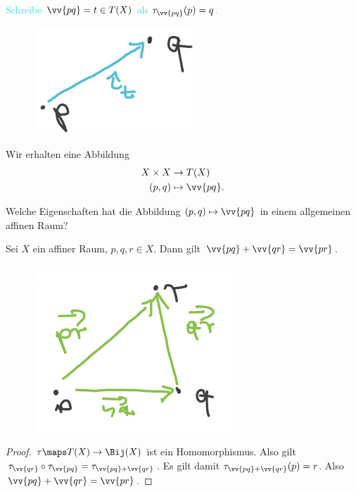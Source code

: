 \textcolor{Turquoise}{Schreibe \( \vv{pq}=t\in T(X) \) als \( \tau_{\vv{pq}}(p)=q \).}
\begin{figure}[H]
    \centering
    \includegraphics[width=0.2\linewidth]{figures/vektornotation}
    \label{fig:vektornotation}
\end{figure}
Wir erhalten eine Abbildung
\begin{align*}
    X\times X&\to T(X)\\
    (p,q)&\mapsto \vv{pq}.
\end{align*}
\begin{frage*}
    Welche Eigenschaften hat die Abbildung \( (p,q)\mapsto \vv{pq} \) in einem allgemeinen affinen Raum?
\end{frage*}
\begin{lemma}\label{vektoren_funzen_richtig}
    Sei \( X \) ein affiner Raum, \( p,q,r\in X \). Dann gilt \( \vv{pq}+\vv{qr}=\vv{pr} \).
\end{lemma}
\begin{figure}[H]
    \centering
    \includegraphics[width=0.3\linewidth]{figures/vektoren_funzen_richtig}
    \label{fig:vektoren_funzen_richtig}
\end{figure}
\begin{proof}
    \( \tau\maps T(X)\to \Bij(X) \) ist ein Homomorphismus. 
    Also gilt \( \tau_{\vv{qr}}\circ \tau_{\vv{pq}}=\tau_{\vv{pq}+\vv{qr}} \). 
    Es gilt damit \( \tau_{\vv{pq}+\vv{qr}}(p)=r \). 
    Also \( \vv{pq}+\vv{qr}=\vv{pr} \).    
\end{proof}

